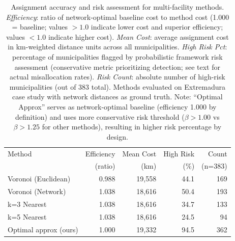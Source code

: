 \begin{table}[htbp]
\caption{Assignment accuracy and risk assessment for multi-facility methods.
\textit{Efficiency}: ratio of network-optimal baseline cost to method cost (1.000 = baseline; values $>1.0$ indicate lower cost and superior efficiency; values $<1.0$ indicate higher cost).
\textit{Mean Cost}: average assignment cost in km-weighted distance units across all municipalities.
\textit{High Risk Pct}: percentage of municipalities flagged by probabilistic framework risk assessment (conservative metric prioritizing detection; see text for actual misallocation rates).
\textit{Risk Count}: absolute number of high-risk municipalities (out of 383 total).
Methods evaluated on Extremadura case study with network distances as ground truth.
Note: ``Optimal Approx'' serves as network-optimal baseline (efficiency 1.000 by definition) and uses more conservative risk threshold ($\beta > 1.00$ vs $\beta > 1.25$ for other methods), resulting in higher risk percentage by design.}
\label{tab:multifacility_accuracy}
\centering
\begin{tabular}{lrrrr}
\toprule
Method & Efficiency & Mean Cost & High Risk & Count \\
       & (ratio)    & (km)      & (\%)      & (n=383) \\
\midrule
Voronoi (Euclidean) & 0.988 & 19,558 & 44.1 & 169 \\
Voronoi (Network) & 1.038 & 18,616 & 50.4 & 193 \\
k=3 Nearest & 1.038 & 18,616 & 34.7 & 133 \\
k=5 Nearest & 1.038 & 18,616 & 24.5 & 94 \\
Optimal approx (ours) & 1.000 & 19,332 & 94.5 & 362 \\
\bottomrule
\end{tabular}
\end{table}

